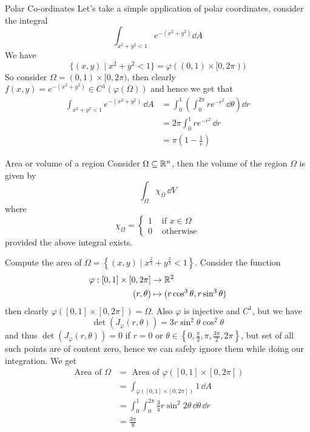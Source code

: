 \documentclass[../Analysis-3]{subfiles}
\begin{document}
\begin{Eg}{Polar Co-ordinates}{}
    Let's take a simple application of polar coordinates, consider the integral
    \[
        \int_{x^2 + y^2 < 1} e^{-(x^2+y^2)} \dd A
    \]
    We have
    \[
        \{ (x,y) \mid x^2 + y^2 < 1 \} = \varphi( (0,1) \times [0,2\pi))
    \]
    So consider $\Omega = (0,1) \times [0,2\pi)$, then clearly $f(x,y) = e^{-(x^2+y^2)} \in C^1(\varphi(\Omega))$ and hence we get that
    \begin{align*}
        \int_{x^2+y^2 < 1} e^{-(x^2+y^2)} \, \dd A & = \int_0^1 \left( \int_0^{2\pi} re^{-r^2} \, \dd \theta \right) \dd r \\
                                                   & = 2\pi \int_0^1 r e^{-r^2} \, \dd r                                   \\
                                                   & = \pi \left( 1 - \frac{1}{e}\right)
    \end{align*}
\end{Eg}

\begin{Def}{Area or volume of a region}{}
    Consider $\Omega \subseteq \mathbb{R}^n$, then the volume of the region $\Omega$ is given by
    \[
        \int_{\Omega} \chi_{\Omega} \, \dd V
    \]
    where
    \[
        \chi_{\Omega} = \begin{cases}
            1 & \mbox{ if } x \in \Omega \\
            0 & \mbox{ otherwise}
        \end{cases}
    \]
    provided the above integral exists.
\end{Def}

\begin{Eg}{}{}
    Compute the area of $\Omega = \left\{ (x,y) \mid x^{\frac{2}{3}} + y^{\frac{2}{3}} < 1 \right\}$. Consider the function
    \begin{align*}
        \varphi : [0,1] \times [0,2\pi] & \to \mathbb{R}^2                                 \\
        (r,\theta)                      & \mapsto ( r\cos^3\theta, r\sin^3\theta )
    \end{align*}
    then clearly $\varphi([0,1] \times [0,2\pi]) = \Omega$. Also $\varphi$ is injective and $C^1$, but we have
    \[
        \det(J_{\varphi}(r,\theta)) = 3r \sin^2\theta \cos^2\theta
    \]
    and thus $\det(J_{\varphi}(r,\theta)) = 0$ if $r = 0$ or $\theta \in \left\{ 0, \frac{\pi}{2}, \pi, \frac{3\pi}{2}, 2\pi \right\}$, but set of all such points are of content zero, hence we can safely ignore them while doing our integration. We get
    \begin{align*}
        \mbox{ Area of } \Omega & = \mbox{ Area of } \varphi \left( [0,1] \times [0,2\pi] \right)              \\
                                & = \int_{\varphi([0,1] \times [0,2\pi])} 1 \, \dd A                           \\
                                & = \int_0^1 \int_0^{2\pi} \frac{3}{4} r \sin^2 2\theta \, \dd \theta \, \dd r \\
                                & = \frac{3\pi}{8}
    \end{align*}
\end{Eg}
\end{document}

